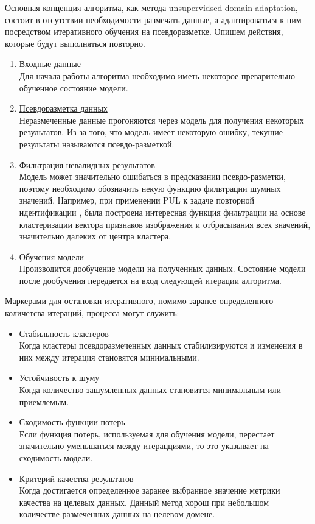Основная концепция алгоритма, как метода unsupervidsed domain adaptation, состоит в отсутствии необходимости размечать данные, а адаптироваться к ним посредством итеративного обучения на псевдоразметке. Опишем действия, которые будут выполняться повторно.

\begin{enumerate}

\item \underline{Входные данные}\\
Для начала работы алгоритма необходимо иметь некоторое преварительно обученное состояние модели.

\item \underline{Псевдоразметка данных}\\ 
Неразмеченные данные прогоняются через модель для получения некоторых результатов. Из-за того, что модель имеет некоторую ошибку, текущие результаты называются псевдо-разметкой.

\item \underline{Фильтрация невалидных результатов}\\
Модель может значительно ошибаться в предсказании псевдо-разметки, поэтому необходимо обозначить некую функцию фильтрации шумных значений. Например, при применении PUL к задаче повторной идентификации \cite{pul_person}, была построена интересная функция фильтрации на основе кластеризации вектора признаков изображения и отбрасывания всех значений, значительно далеких от центра кластера.

\item \underline{Обучения модели}\\
Производится дообучение модели на полученных данных. Состояние модели после дообучения передается на вход следующей итерации алгоритма. 
\end{enumerate}

Маркерами для остановки итеративного, помимо заранее определенного количетсва итераций, процесса могут служить:
\begin{itemize}
\item Стабильность кластеров\\
Когда кластеры псевдоразмеченных данных стабилизируются и изменения в них между итерация становятся минимальными.
\item Устойчивость к шуму\\
Когда количество зашумленных данных становится минимальным или приемлемым.
\item Сходимость функции потерь\\
Если функция потерь, используемая для обучения модели, перестает значительно уменьшаться между итерацциями, то это указывает на сходимость модели.
\item Критерий качества результатов\\
Когда достигается определенное заранее выбранное значение метрики качества на целевых данных. Данный метод хорош при небольшом количестве размеченных данных на целевом домене.
\end{itemize}

